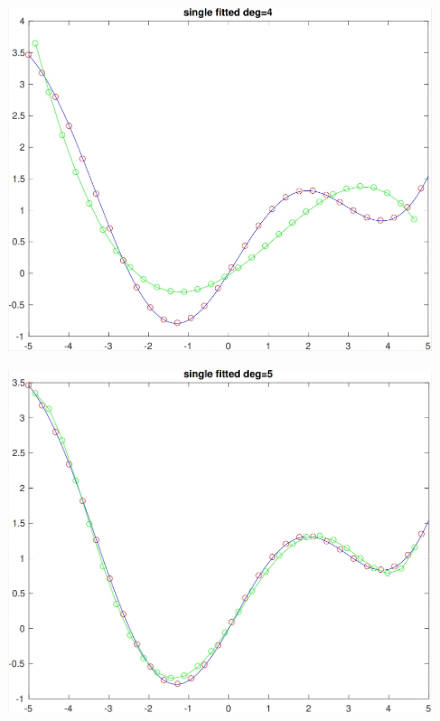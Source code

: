 \begin{figure}[h!]
\centering\includegraphics[scale=0.3]{clean_poly_d_4.png}
\end{figure}


\begin{figure}[h!]
\centering\includegraphics[scale=0.3]{clean_poly_d_5.png}
\end{figure}


